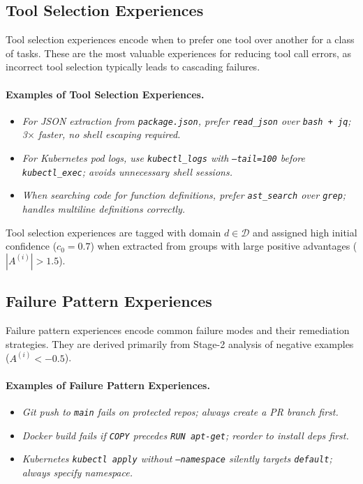 \documentclass[11pt]{article}
\begin{document}
\subsection{Tool Selection Experiences}

Tool selection experiences encode when to prefer one tool over another for
a class of tasks. These are the most valuable experiences for reducing tool
call errors, as incorrect tool selection typically leads to cascading failures.

\paragraph{Examples of Tool Selection Experiences.}
\begin{itemize}[leftmargin=1.5em]
    \item \textit{For JSON extraction from \texttt{package.json}, prefer
          \texttt{read\_json} over \texttt{bash\,+\,jq}; 3$\times$ faster,
          no shell escaping required.}
    \item \textit{For Kubernetes pod logs, use \texttt{kubectl\_logs}
          with \texttt{--tail=100} before \texttt{kubectl\_exec}; avoids
          unnecessary shell sessions.}
    \item \textit{When searching code for function definitions, prefer
          \texttt{ast\_search} over \texttt{grep}; handles multiline
          definitions correctly.}
\end{itemize}

Tool selection experiences are tagged with domain $d \in \mathcal{D}$ and
assigned high initial confidence ($c_0 = 0.7$) when extracted from groups with
large positive advantages ($|A^{(i)}| > 1.5$).

\subsection{Failure Pattern Experiences}

Failure pattern experiences encode common failure modes and their remediation
strategies. They are derived primarily from Stage-2 analysis of negative
examples ($A^{(i)} < -0.5$).

\paragraph{Examples of Failure Pattern Experiences.}
\begin{itemize}[leftmargin=1.5em]
    \item \textit{Git push to \texttt{main} fails on protected repos; always
          create a PR branch first.}
    \item \textit{Docker build fails if \texttt{COPY} precedes \texttt{RUN
          apt-get}; reorder to install deps first.}
    \item \textit{Kubernetes \texttt{kubectl apply} without \texttt{--namespace}
          silently targets \texttt{default}; always specify namespace.}
\end{itemize}
\end{document}
